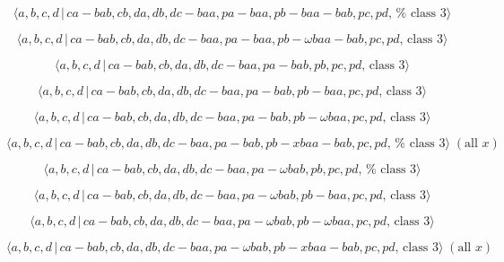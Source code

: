 \documentclass[10pt]{article}
\begin{document}
\begin{equation}
\langle a,b,c,d\,|\,ca-bab,cb,da,db,dc-baa,pa-baa,pb-baa-bab,pc,pd,\,\text{%
class }3\rangle  \tag{7.3503}
\end{equation}

\begin{equation}
\langle a,b,c,d\,|\,ca-bab,cb,da,db,dc-baa,pa-baa,pb-\omega baa-bab,pc,pd,\,%
\text{class }3\rangle  \tag{7.3504}
\end{equation}

\begin{equation}
\langle a,b,c,d\,|\,ca-bab,cb,da,db,dc-baa,pa-bab,pb,pc,pd,\,\text{class }%
3\rangle  \tag{7.3505}
\end{equation}

\begin{equation}
\langle a,b,c,d\,|\,ca-bab,cb,da,db,dc-baa,pa-bab,pb-baa,pc,pd,\,\text{class 
}3\rangle  \tag{7.3506}
\end{equation}

\begin{equation}
\langle a,b,c,d\,|\,ca-bab,cb,da,db,dc-baa,pa-bab,pb-\omega baa,pc,pd,\,%
\text{class }3\rangle  \tag{7.3507}
\end{equation}

\begin{equation}
\langle a,b,c,d\,|\,ca-bab,cb,da,db,dc-baa,pa-bab,pb-xbaa-bab,pc,pd,\,\text{%
class }3\rangle \;(\text{all }x)  \tag{7.3508}
\end{equation}

\begin{equation}
\langle a,b,c,d\,|\,ca-bab,cb,da,db,dc-baa,pa-\omega bab,pb,pc,pd,\,\text{%
class }3\rangle  \tag{7.3509}
\end{equation}

\begin{equation}
\langle a,b,c,d\,|\,ca-bab,cb,da,db,dc-baa,pa-\omega bab,pb-baa,pc,pd,\,%
\text{class }3\rangle  \tag{7.3510}
\end{equation}

\begin{equation}
\langle a,b,c,d\,|\,ca-bab,cb,da,db,dc-baa,pa-\omega bab,pb-\omega
baa,pc,pd,\,\text{class }3\rangle  \tag{7.3511}
\end{equation}

\begin{equation}
\langle a,b,c,d\,|\,ca-bab,cb,da,db,dc-baa,pa-\omega bab,pb-xbaa-bab,pc,pd,\,%
\text{class }3\rangle \;(\text{all }x)  \tag{7.3512}
\end{equation}
\end{document}
